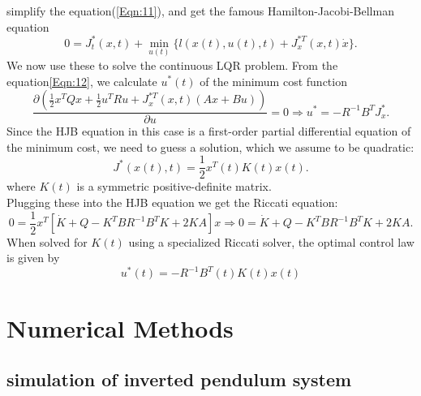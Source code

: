 \documentclass[a4paper,11pt]{article}
\begin{document}
simplify the equation(\ref{Eqn:11}), and get the famous Hamilton-Jacobi-Bellman equation
\begin{equation}
	0 = J_t^*(x,t) + \min_{u(t)}{\{l(x(t),u(t),t)+J_{x}^{*T}(x,t)\dot{x}\}}.	\label{Eqn:12}
\end{equation}
We now use these to solve the continuous LQR problem. From the equation\ref{Eqn:12}, we calculate $u^*(t)$ of the minimum cost function
\begin{equation}
	\frac{\partial (\frac{1}{2}x^TQx +\frac{1}{2}u^TRu+J_{x}^{*T}(x,t)(Ax+Bu))}{\partial u}=0 \Longrightarrow u^{*} = -R^{-1}B^TJ^*_x .	\label{Eqn:13}
\end{equation}
Since the HJB equation in this case is a first-order partial differential equation of the minimum cost, we need to guess a solution, which we assume to be quadratic:
\begin{equation}
	J^*(x(t),t) = \frac{1}{2}x^T(t)K(t)x(t).	\label{Eqn:14}
\end{equation}
where $K(t)$ is a symmetric positive-definite matrix.\\
Plugging these into the HJB equation we get the Riccati equation:
\begin{equation}
	0 = \frac{1}{2}x^T[\dot K + Q -K^TBR^{-1}B^TK+2KA]x \Longrightarrow 0 = \dot K + Q -K^TBR^{-1}B^TK+2KA. \label{Eqn:15} 
\end{equation}
When solved for $K(t)$ using a specialized Riccati solver, the optimal control law is given by
\begin{equation}
	u^{*}(t) = -R^{-1}B^T(t)K(t)x(t) \label{Eqn:16} 
\end{equation}

\section{Numerical Methods}
\subsection{simulation of inverted pendulum system}
\end{document}

